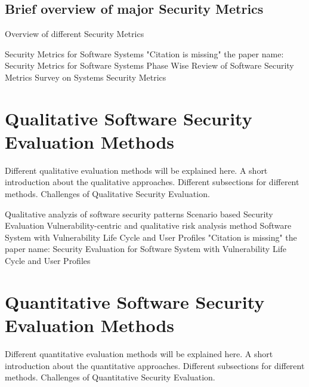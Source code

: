 \documentclass[pdftex,english,oribibl]{llncs}
\begin{document}
\subsection{Brief overview of major Security Metrics}
Overview of different  Security Metrics\newline

	Security Metrics for Software Systems\cite{Wang:2009:SMS:1566445.1566509}\newline
	"Citation is missing" the paper name: Security Metrics for Software Systems\newline
	Phase Wise Review of Software Security Metrics\cite{Ansar:PWRSSM}\newline
	Survey on Systems Security Metrics\cite{Pendleton:2016:SSS:3022634.3005714}\newline
	
\section{Qualitative Software Security Evaluation Methods}
Different qualitative evaluation methods will be explained here.\newline
A short introduction about the qualitative approaches.\newline
Different subsections for different methods.\newline
Challenges of Qualitative Security Evaluation.\newline

	Qualitative analyzis of software security patterns\cite{5564015}\newline
 	Scenario based Security Evaluation\cite{Halkidis:2006:QAS:2639528.2639723}\newline
  	Vulnerability-centric and qualitative risk analysis method\cite{6165757}\newline
  	Software System with Vulnerability Life Cycle and User Profiles\cite{6532147}\newline
  	"Citation is missing" the paper name: Security Evaluation for Software System with Vulnerability Life Cycle and User Profiles\newline
  
\section{Quantitative Software Security Evaluation Methods}
Different quantitative evaluation methods will be explained here.\newline
A short introduction about the quantitative approaches.\newline
Different subsections for different methods.\newline
Challenges of Quantitative Security Evaluation.\newline
\end{document}
